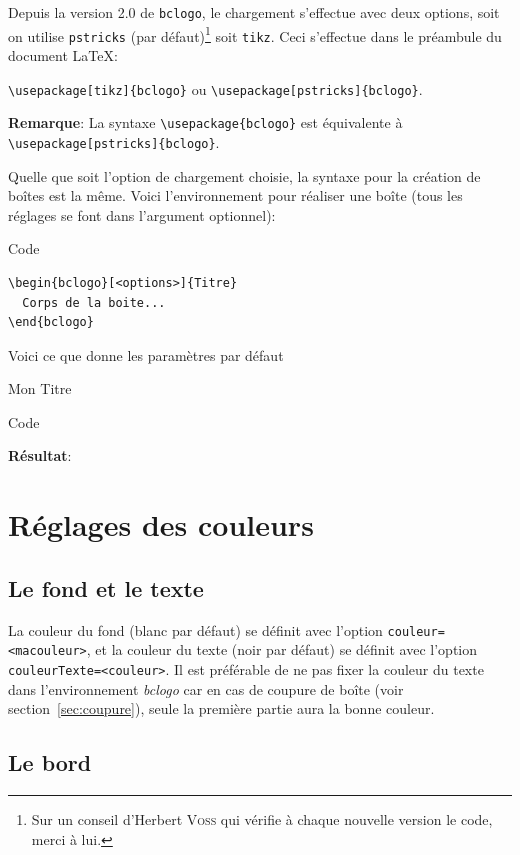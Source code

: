 \documentclass[a4paper,10pt,frenchb]{article}
\newenvironment*{Code}{%
  \begin{bclogo}[margeG=1,logo=\bccrayon,couleurBarre=Gray,barre=wave,noborder]{Code}%
}%
{%
\end{bclogo}
}%
\newenvironment*{demo}{%
\VerbatimOut{toto.txt}%
}%
{%
\endVerbatimOut%
\begin{bclogo}[margeG=1,logo=\bccrayon,couleurBarre=Gray,barre=wave,noborder]{Code}%
\begin{footnotesize}%
%
\end{footnotesize}%
\end{bclogo}%
\noindent\textbf{Résultat}:\par\smallskip
%
}%
\newcommand*\cmd{\color{Maroon}}%
\begin{document}
Depuis la version 2.0 de \texttt{bclogo}, le chargement s'effectue avec deux
options, soit on utilise \texttt{pstricks} (par défaut)\footnote{Sur un conseil
d'Herbert \textsc{Voss} qui vérifie à chaque nouvelle version le code, merci à
lui.} soit \texttt{tikz}. Ceci s'effectue dans le préambule du document
\LaTeX{}:

\medskip
\hfil{\cmd\verb|\usepackage[tikz]{bclogo}|} ou {\cmd\verb|\usepackage[pstricks]{bclogo}|.}\hfil

\medskip
\noindent\textbf{Remarque}: La syntaxe {\cmd\verb|\usepackage{bclogo}|} est équivalente à {\cmd\verb|\usepackage[pstricks]{bclogo}|}.

Quelle que soit l'option de chargement choisie, la syntaxe pour la création de boîtes est la même. Voici l'environnement pour réaliser une boîte (tous les réglages se font dans l'argument optionnel):
\begin{Code}
\begin{lstlisting}
\begin{bclogo}[<options>]{Titre}
  Corps de la boite...
\end{bclogo}
\end{lstlisting}
\end{Code}

Voici ce que donne les paramètres par défaut
\begin{demo}
\begin{bclogo}{Mon Titre}
  \lipsum[1]
\end{bclogo}
\end{demo}


\section{Réglages des couleurs}

\subsection{Le fond et le texte}

La couleur du fond (blanc par défaut) se définit avec l'option
{\cmd\verb|couleur=<macouleur>|}, et la couleur du texte (noir par
défaut) se définit avec l'option
{\cmd\verb|couleurTexte=<couleur>|}. Il est préférable de ne pas fixer
la couleur du texte dans l'environnement \emph{bclogo} car en cas de
coupure de boîte (voir section~\ref{sec:coupure}), seule la première
partie aura la bonne couleur.

\subsection{Le bord}
\end{document}
